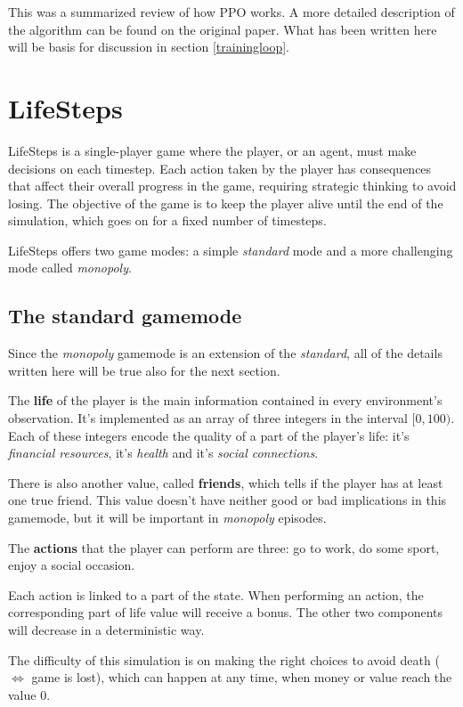 \documentclass{article}
\begin{document}
This was a summarized review of how PPO works. A more detailed description of the algorithm can be found on the original paper. What has been written here will be basis for discussion in section \ref{trainingloop}.

\section{LifeSteps}
LifeSteps is a single-player game where the player, or an agent, must make decisions on each timestep. Each action taken by the player has consequences that affect their overall progress in the game, requiring strategic thinking to avoid losing. The objective of the game is to keep the player alive until the end of the simulation, which goes on for a fixed number of timesteps. 

LifeSteps offers two game modes: a simple \textit{standard} mode and a more challenging mode called \textit{monopoly}.

\subsection{The standard gamemode}
Since the \textit{monopoly} gamemode is an extension of the \textit{standard}, all of the details written here will be true also for the next section.

The \textbf{life} of the player is the main information contained in every environment's observation. It's implemented as an array of three integers in the interval \([0, 100)\). Each of these integers encode the quality of a part of the player's life: it's \textit{financial resources}, it's \textit{health} and it's \textit{social connections}.

There is also another value, called \textbf{friends}, which tells if the player has at least one true friend. This value doesn't have neither good or bad implications in this gamemode, but it will be important in \textit{monopoly} episodes. 

The \textbf{actions} that the player can perform are three: go to work, do some sport, enjoy a social occasion. 

Each action is linked to a part of the state. When performing an action, the corresponding part of life value will receive a bonus. The other two components will decrease in a deterministic way. 

The difficulty of this simulation is on making the right choices to avoid death (\(\Leftrightarrow\) game is lost), which can happen at any time, when money or value reach the value 0. 
\end{document}
